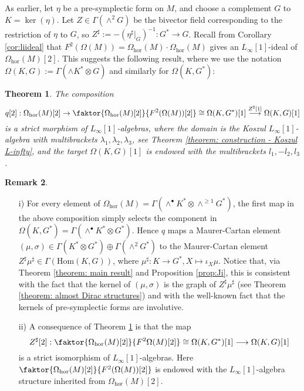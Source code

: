 \documentclass[11pt,thmsa]{amsart}
\newtheorem{theorem}{Theorem}[section]
\theoremstyle{definition}
\newtheorem{remark}[theorem]{Remark}
\newcommand{\hor}{\mathrm{hor}}
\begin{document}
As earlier, let $\eta$ be a pre-symplectic form on $M$, and choose a complement $G$ to 
$K=\ker(\eta)$. Let $Z \in\Gamma(\wedge^2 G)$ be the bivector field corresponding to the restriction of $\eta$ to $G$, so $Z^{\sharp}:=-(\eta^\sharp|_G)^{-1}\colon G^*\to G$. Recall from Corollary \ref{cor:liideal} that $F^{2}(\Omega(M))=\Omega_\hor(M)\cdot \Omega_\hor(M)$ gives an $L_{\infty}[1]$-ideal of $\Omega_\hor(M)[2]$. This suggests the following result, where we use the notation $\Omega(K,G):=\Gamma(\wedge K^*\otimes G)$ and similarly for $\Omega(K,G^*)$:
\begin{theorem}\label{theorem: characteristic foliation}
 The composition 
$$ q[2]: \Omega_\hor(M)[2] \rightarrow \faktor{\Omega_\hor(M)[2]}{F^2(\Omega(M))[2]} \cong \Omega(K,G^*)[1] \stackrel{Z^{\sharp}[1]}{\longrightarrow} \Omega(K,G)[1]$$
is a strict morphism of $L_\infty[1]$-algebras,
where the domain is the Koszul $L_{\infty}[1]$-algebra with multibrackets 
$\lambda_1,\lambda_2,\lambda_3$, see Theorem \ref{theorem: construction - Koszul L-infty}, and
 the target $\Omega(K,G)[1]$ is endowed with the multibrackets
$l_1,-l_2,l_3$.
\end{theorem}
\begin{remark}
\begin{itemize}
\item[i)] For every element of $\Omega_\hor(M)=\Gamma(\wedge^{\bullet} K^*\otimes \wedge^{\ge 1} G^*)$, the first map in the above composition 
simply selects the component in  
$\Omega(K,G^*)=\Gamma(\wedge^{\bullet} K^*\otimes G^*)$.
Hence $q$ maps a Maurer-Cartan element $(\mu,\sigma)\in  \Gamma(K^*\otimes G^*) \oplus\Gamma(\wedge^2G^*)$ to the Maurer-Cartan element $Z^{\sharp}\mu^{\sharp}\in \Gamma(\mathrm{Hom}(K,G))$,  where $\mu^{\sharp}\colon K\to G^*, X\mapsto \iota_X\mu$.
Notice that, via Theorem \ref{theorem: main result} and Proposition \ref{prop:Ji}, this is consistent with the fact that the kernel of $(\mu,\sigma)$ is the graph of $Z^{\sharp}\mu^{\sharp}$ (see Theorem \ref{theorem: almost Dirac structures}) and with the well-known fact that the kernels of pre-symplectic forms are involutive.
\item[ii)] A consequence of Theorem \ref{theorem: characteristic foliation} is that the map
$$Z^{\sharp}[2]: \faktor{\Omega_\hor(M)[2]}{F^2\Omega(M)[2]} \cong \Omega(K,G^*)[1] \longrightarrow \Omega(K,G)[1]$$
is a strict isomorphism of $L_{\infty}[1]$-algebras. Here
$\faktor{\Omega_\hor(M)[2]}{F^2(\Omega(M))[2]}$ is endowed with the $L_{\infty}[1]$-algebra structure inherited from $\Omega_\hor(M)[2]$. 
\end{itemize}
\end{remark}
\end{document}
